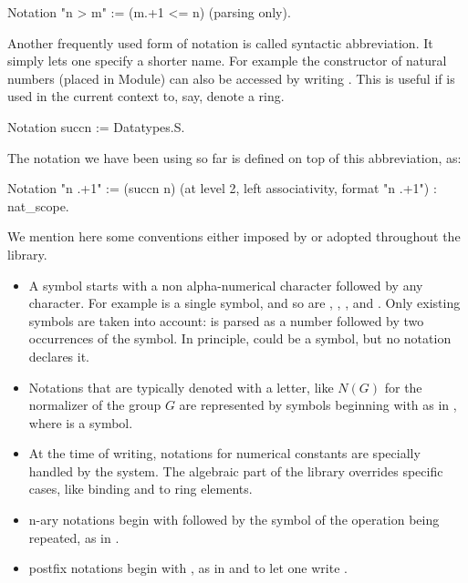 \begin{coq}{}{}
Notation "n > m"  := (m.+1 <= n) (parsing only).
\end{coq}

Another frequently used form of notation is called syntactic abbreviation.
It simply lets one specify a shorter name.  For example the  constructor
of natural numbers (placed in  Module) can also be accessed
by writing .  This is useful if  is used in the current context
to, say, denote a ring.

\begin{coq}{}{}
Notation succn := Datatypes.S.
\end{coq}

The notation  we have been using so far is defined on top of
this abbreviation, as:
\begin{coq}{}{}
Notation "n .+1" := (succn n) (at level 2, left associativity,
  format "n .+1") : nat_scope.
\end{coq}



We mention here some conventions either imposed by \Coq{}
or adopted throughout the \mcbMC{} library.

\begin{itemize}
\item A symbol starts with a non alpha-numerical character followed by
	any character.  For example  is a single symbol, and so are
	, \C{\%/}, \C{<=}, and \C{[::}.  Only existing
	symbols are taken into account:  is parsed as a number
	followed by two occurrences of the  symbol.  In principle,
          could be a symbol, but no notation declares it.
\item Notations that are typically denoted with a letter, like $N(G)$ for the
	normalizer of the group $G$ are represented by symbols beginning
	with  as in , where  is a symbol.
\item At the time of writing, notations for numerical constants are specially
	handled by the system.  The algebraic part of the library overrides
	specific cases, like binding  and  to ring elements.
\item n-ary notations begin with \C{[} followed by the symbol of the
	operation being repeated, as in .
\item postfix notations begin with , as in  and 
	to let one write .
\end{itemize}


